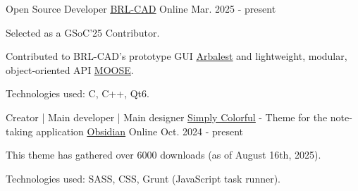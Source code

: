 



\begin{cventries}
  \cventry
    {Open Source Developer} %
    {\underline{\href{https://github.com/BRL-CAD/brlcad}{BRL-CAD}}} %
    {Online} %
    {Mar. 2025 - present} %
    {
      \begin{cvitems} %
        \item {Selected as a GSoC'25 Contributor.}
        \item {Contributed to BRL-CAD's prototype GUI \underline{\href{https://github.com/BRL-CAD/arbalest}{Arbalest}} and lightweight, modular, object‑oriented API \underline{\href{https://github.com/BRL-CAD/MOOSE}{MOOSE}}.}
        \item {Technologies used: C, C++, Qt6.}
      \end{cvitems}
    }

\end{cventries}




\begin{cventries}
  \cventry
    {Creator | Main developer | Main designer} %
    {\underline{\href{https://github.com/LorenzoPegorari/SimplyColorful}{Simply Colorful}} - Theme for the note-taking application \underline{\href{https://obsidian.md}{Obsidian}}} %
    {Online} %
    {Oct. 2024 - present} %
    {
      \begin{cvitems} %
        \item {This theme has gathered over 6000 downloads (as of August 16th, 2025).}
        \item {Technologies used: SASS, CSS, Grunt (JavaScript task runner).}
      \end{cvitems}
    }

\end{cventries}
